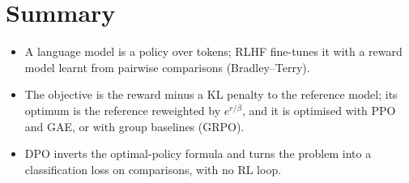 \section{Summary}

\begin{itemize}[nosep]
  \item A language model is a policy over tokens; RLHF fine-tunes it with a
    reward model learnt from pairwise comparisons (Bradley--Terry).
  \item The objective is the reward minus a KL penalty to the reference
    model; its optimum is the reference reweighted by $e^{r/\beta}$, and
    it is optimised with PPO and GAE, or with group baselines (GRPO).
  \item DPO inverts the optimal-policy formula and turns the problem into
    a classification loss on comparisons, with no RL loop.
\end{itemize}
